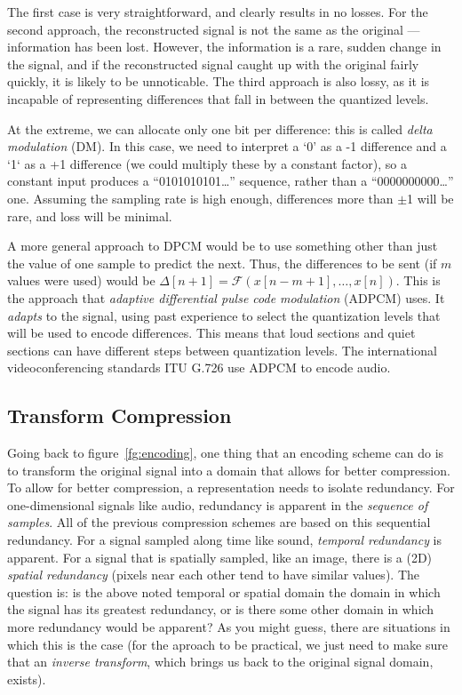 The first case is very straightforward, and clearly results in no
losses.  For the second approach, the reconstructed signal is not the
same as the original --- information has been lost. However, the
information is a rare, sudden change in the signal, and if the
reconstructed signal caught up with the original fairly quickly, it is
likely to be unnoticable. The third approach is also lossy, as it is
incapable of representing differences that fall in between the
quantized levels.

At the extreme, we can allocate only one bit per difference: this is
called \emph{delta modulation} (DM).  In this case, we need to
interpret a `0' as a -1 difference and a `1` as a +1 difference (we
could multiply these by a constant factor), so a constant input
produces a ``0101010101\ldots'' sequence, rather than a
``0000000000\ldots'' one.  Assuming the sampling rate is high enough,
differences more than $\pm$1 will be rare, and loss will be minimal.

A more general approach to DPCM would be to use something other than
just the value of one sample to predict the next. Thus, the
differences to be sent (if $m$ values were used) would be $\Delta[n+1]
= \mathcal{F}(x[n-m+1], \ldots, x[n])$.  This is the approach that
\emph{adaptive differential pulse code modulation} (ADPCM) uses.  It
\emph{adapts} to the signal,  using past experience to
select the quantization levels that will be used to encode
differences.  This means that loud sections and quiet sections can
have different steps between quantization levels.  The international
videoconferencing standards ITU G.726 use ADPCM to encode audio.

\subsection{Transform Compression}

Going back to figure~\ref{fg:encoding}, one thing that an encoding
scheme can do is to transform the original signal into a domain that
allows for better compression. To allow for better compression, a
representation needs to isolate redundancy. For one-dimensional
signals like audio, redundancy is apparent in the \emph{sequence of
samples}.  All of the previous compression schemes are based on this
sequential redundancy. For a signal sampled along time like sound,
\emph{temporal redundancy} is apparent. For a signal that is spatially
sampled, like an image, there is a (2D) \emph{spatial redundancy}
(pixels near each other tend to have similar values).  The question
is: is the above noted temporal or spatial domain the domain in which
the signal has its greatest redundancy, or is there some other domain
in which more redundancy would be apparent? As you might guess, there
are situations in which this is the case (for the aproach to be
practical, we just need to make sure that an \emph{inverse transform},
which brings us back to the original signal domain, exists).

